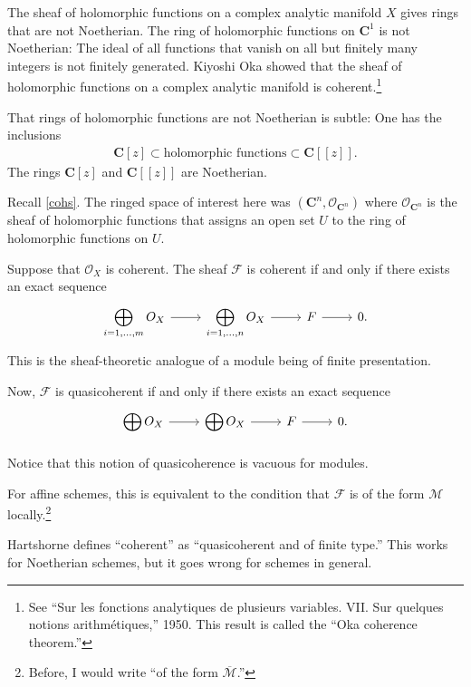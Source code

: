 \documentclass [11 pt, oneside] {article}
\begin{document}
The sheaf of holomorphic functions on a complex analytic manifold $X$ gives rings that are not Noetherian. The ring of holomorphic functions on $\mathbf{C}^1$ is not Noetherian: The ideal of all functions that vanish on all but finitely many integers is not finitely generated. Kiyoshi Oka showed that the sheaf of holomorphic functions on a complex analytic manifold is coherent.\footnote{See ``Sur les fonctions analytiques de plusieurs variables. VII. Sur quelques notions arithmétiques,'' 1950. This result is called the ``Oka coherence theorem.''}

That rings of holomorphic functions are not Noetherian is subtle: One has the inclusions
\begin{align*}
	\mathbf{C}[z] \subset \textrm{holomorphic functions} \subset \mathbf{C}[\![z]\!].
\end{align*}
The rings $\mathbf{C}[z]$ and $\mathbf{C}[\![z]\!]$ are Noetherian.

Recall \cref{cohs}. The ringed space of interest here was $(\mathbf{C}^n, \mathscr{O}_{\mathbf{C}^n})$ where $\mathscr{O}_{\mathbf{C}^n}$ is the sheaf of holomorphic functions that assigns an open set $U$ to the ring of holomorphic functions on $U$.

Suppose that $\mathscr{O}_X$ is coherent. The sheaf $\mathscr{F}$ is coherent if and only if there exists an exact sequence
\[
\begin{tikzcd}
	\displaystyle\bigoplus_{i=1,\hdots,m} \mathscr{O}_X\ar[r]& \displaystyle\bigoplus_{i=1,\hdots,n} \mathscr{O}_X \ar[r]&\mathscr{F}\ar[r]&0.
\end{tikzcd}
\]
This is the sheaf-theoretic analogue of a module being of finite presentation.

Now, $\mathscr{F}$ is quasicoherent if and only if there exists an exact sequence
\[
\begin{tikzcd}
	\displaystyle \bigoplus_{}\mathscr{O}_X \ar[r] & \displaystyle \bigoplus_{}\mathscr{O}_X\ar[r]&\mathscr{F}\ar[r]&0.
\end{tikzcd}
\]
Notice that this notion of quasicoherence is vacuous for modules.

For affine schemes, this is equivalent to the condition that $\mathscr{F}$ is of the form $\mathscr{M}$ locally.\footnote{Before, I would write ``of the form $\overline{\mathscr{M}}$.''}

\begin{remark}
	Hartshorne defines ``coherent'' as ``quasicoherent and of finite type.'' This works for Noetherian schemes, but it goes wrong for schemes in general.
\end{remark}
\end{document}

